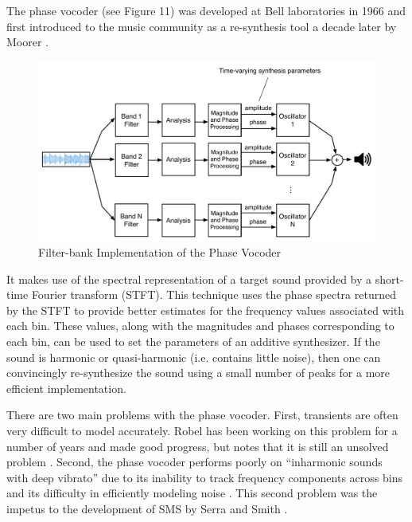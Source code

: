 \documentclass[12pt]{report} 	%
\numberwithin{figure}{chapter}
\numberwithin{table}{chapter}
\numberwithin{equation}{chapter}
\begin{document}
\begin{flushleft}
The phase vocoder (see Figure 11) was developed at Bell laboratories in 1966 and first introduced to the music community as a re-synthesis tool a decade later by Moorer \cite{Moorer:1978ge}. \begin{figure}[h!]
\vspace{24pt}
\begin{center}
\includegraphics[scale=0.45]{PhaseVocoder}
\caption[Phase vocoder]{Filter-bank Implementation of the Phase Vocoder}
\end{center}
\vspace{6pt}
\end{figure}
It makes use of the spectral representation of a target sound provided by a short-time Fourier transform (STFT). This technique uses the phase spectra returned by the STFT to provide better estimates for the frequency values associated with each bin. These values, along with the magnitudes and phases corresponding to each bin, can be used to set the parameters of an additive synthesizer. If the sound is harmonic or quasi-harmonic (i.e. contains little noise), then one can convincingly re-synthesize the sound using a small number of peaks for a more efficient implementation. 

There are two main problems with the phase vocoder. First, transients are often very difficult to model accurately. Robel has been working on this problem for a number of years \cite{Robel:2003vh,Robel:2010dp} and made good progress, but notes that it is still an unsolved problem \cite[p. 1]{Robel:2010dp}. Second, the phase vocoder performs poorly on ``inharmonic sounds with deep vibrato'' due to its inability to track frequency components across bins and its difficulty in efficiently modeling noise \cite[p. 13]{Serra:1990dk}. This second problem was the impetus to the development of SMS by Serra and Smith \cite{Serra:1990dk}.


\end{flushleft}
\end{document}
